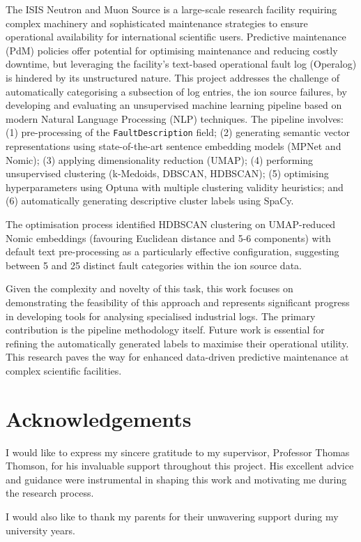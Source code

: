 \documentclass[10pt,oneside]{report}
\begin{document}
The ISIS Neutron and Muon Source is a large-scale research facility requiring complex machinery and sophisticated maintenance strategies to ensure operational availability for international scientific users. Predictive maintenance (PdM) policies offer potential for optimising maintenance and reducing costly downtime, but leveraging the facility's text-based operational fault log (Operalog) is hindered by its unstructured nature. This project addresses the challenge of automatically categorising a subsection of log entries, the ion source failures, by developing and evaluating an unsupervised machine learning pipeline based on modern Natural Language Processing (NLP) techniques. The pipeline involves: (1) pre-processing of the \texttt{FaultDescription} field; (2) generating semantic vector representations using state-of-the-art sentence embedding models (MPNet and Nomic); (3) applying dimensionality reduction (UMAP); (4) performing unsupervised clustering (k-Medoids, DBSCAN, HDBSCAN); (5) optimising hyperparameters using Optuna with multiple clustering validity heuristics; and (6) automatically generating descriptive cluster labels using SpaCy. 

The optimisation process identified HDBSCAN clustering on UMAP-reduced Nomic embeddings (favouring Euclidean distance and 5-6 components) with default text pre-processing as a particularly effective configuration, suggesting between 5 and 25 distinct fault categories within the ion source data.

Given the complexity and novelty of this task, this work focuses on demonstrating the feasibility of this approach and represents significant progress in developing tools for analysing specialised industrial logs. The primary contribution is the pipeline methodology itself. Future work is essential for refining the automatically generated labels to maximise their operational utility. This research paves the way for enhanced data-driven predictive maintenance at complex scientific facilities.

\chapter*{Acknowledgements}
I would like to express my sincere gratitude to my supervisor, Professor Thomas Thomson, for his invaluable support throughout this project. His excellent advice and guidance were instrumental in shaping this work and motivating me during the research process.

I would also like to thank my parents for their unwavering support during my university years.
\end{document}
